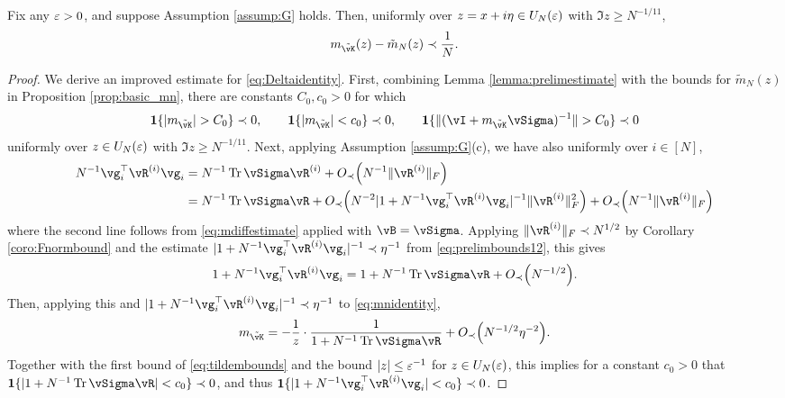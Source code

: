 \begin{lemma}\label{lemma:improvedestimate}
Fix any $\varepsilon>0$, and suppose Assumption \ref{assump:G} holds.
Then, uniformly over $z=x+i\eta \in U_N(\varepsilon)$ with $\Im z \geq N^{-1/11}$,
\[m_{\tilde \vK}(z)-\tilde m_N(z) \prec \frac{1}{N}.\]
\end{lemma}
\begin{proof}
We derive an improved estimate for \eqref{eq:Deltaidentity}. First,
combining Lemma \ref{lemma:prelimestimate} with the bounds for $\tilde m_N(z)$
in Proposition \ref{prop:basic_mn}, there are constants $C_0,c_0>0$ for which
\begin{equation}\label{eq:tildembounds}
\bI\{|m_{\tilde \vK}|>C_0\} \prec 0,
\qquad \bI\{|m_{\tilde \vK}|<c_0\} \prec 0,
\qquad \bI\{\|(\vI+m_{\tilde \vK}\vSigma)^{-1}\|>C_0\} \prec 0
\end{equation}
uniformly over $z \in U_N(\varepsilon)$ with $\Im z \geq N^{-1/11}$. Next, applying
Assumption \ref{assump:G}(c), we have also uniformly over $i \in [N]$,
\begin{align*}
N^{-1}\vg_i^\top \vR^{(i)}\vg_i
&=N^{-1}\Tr \vSigma \vR^{(i)}+\SD{N^{-1}\|\vR^{(i)}\|_F}\\
&=N^{-1}\Tr \vSigma \vR+\SD{N^{-2}|1+N^{-1}\vg_i^\top \vR^{(i)}\vg_i|^{-1}
\|\vR^{(i)}\|_F^2}+\SD{N^{-1}\|\vR^{(i)}\|_F}
\end{align*}
where the second line follows from \eqref{eq:mdiffestimate} applied with
$\vB=\vSigma$. Applying $\|\vR^{(i)}\|_F \prec N^{1/2}$ by Corollary
\ref{coro:Fnormbound} and the estimate $|1+N^{-1}\vg_i^\top \vR^{(i)}\vg_i|^{-1}
\prec \eta^{-1}$ from \eqref{eq:prelimbounds12}, this gives
\begin{equation}\label{eq:1plusgRgbound}
1+N^{-1}\vg_i^\top \vR^{(i)}\vg_i=1+N^{-1}\Tr \vSigma\vR+\SD{N^{-1/2}}.
\end{equation}
Then, applying this and 
$|1+N^{-1}\vg_i^\top \vR^{(i)}\vg_i|^{-1} \prec \eta^{-1}$ 
to \eqref{eq:mnidentity},
\[m_{\tilde \vK}=-\frac{1}{z} \cdot \frac{1}{1+N^{-1}\Tr \vSigma\vR}
+\SD{N^{-1/2}\eta^{-2}}.\]
Together with the first bound of \eqref{eq:tildembounds} and the bound $|z| \leq
\varepsilon^{-1}$ for $z \in U_N(\varepsilon)$, this implies
for a constant $c_0>0$ that $\bI\{|1+N^{-1}\Tr \vSigma\vR|<c_0\} \prec 0$,
and thus $\bI\{|1+N^{-1}\vg_i^\top \vR^{(i)}\vg_i|<c_0\} \prec 0$.


\end{proof}
